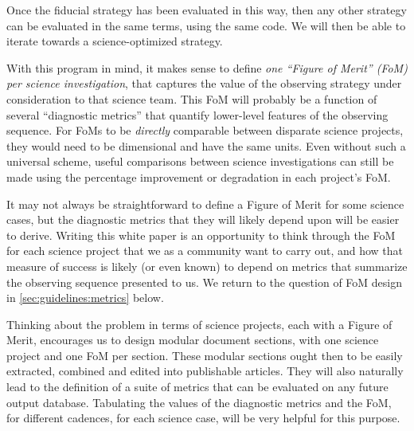Once the fiducial strategy has
been evaluated in this way, then any other strategy can be evaluated
in the same terms, using the same code.  We will then be able to iterate towards a
science-optimized strategy.

With this program in mind, it makes sense to define {\it one ``Figure
of Merit'' (FoM) per science investigation}, that captures the value of  the
observing strategy under consideration to that science team. This FoM
will probably be a function of several ``diagnostic metrics'' that quantify
lower-level features of the observing sequence.  For FoMs
to be {\it directly} comparable between disparate science projects,  they would
need to be dimensional and have the same units. Even without such a universal scheme, useful comparisons between science investigations can still be made using the percentage improvement or degradation in each project's FoM.

It may not always be straightforward to define a Figure of
Merit for some science cases, but the diagnostic metrics that they will likely depend
upon will be easier to derive. Writing this white paper is an
opportunity to think through the FoM for each science
project that we as a community want to carry out, and how that measure
of success is likely (or even known) to depend on metrics that
summarize the observing sequence presented to us. We return to the
question of FoM design in \autoref{sec:guidelines:metrics} below.

Thinking about the problem in terms of science projects, each with a
Figure of Merit, encourages us to design modular document sections, with
one science project and one FoM per section. These modular
sections ought then to be easily extracted, combined and edited into
publishable articles. They will also naturally lead to the definition of
a suite of \MAF metrics that can be evaluated on any future \OpSim output
database.  Tabulating the values of the diagnostic metrics and the FoM,
for different cadences, for each science case, will be very helpful for
this purpose.

